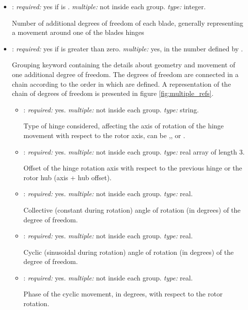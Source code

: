 \begin{itemize}
    \item {}: \textit{required:} yes if  is . \textit{multiple:} not inside each  group. \textit{type:} integer.
    
    Number of additional degrees of freedom of each blade, generally representing a movement around one of the blades hinges
    
    \item {}: \textit{required:} yes if  is greater than zero. \textit{multiple:} yes, in the number defined by . 
    
    Grouping keyword containing the details about geometry and movement of one additional degree of freedom. The degrees of freedom are connected in a chain according to the order in which are defined. A representation of the chain of degrees of freedom is presented in figure \ref{fig:multiple_refs}.
    
    \begin{itemize}
    \item {}: \textit{required:} yes. \textit{multiple:} not inside each  group. \textit{type:} string.
    
    Type of hinge considered, affecting the axis of rotation of the hinge movement with respect to the rotor axis, can be ,, or .
    
    \item {}: \textit{required:} yes. \textit{multiple:} not inside each  group. \textit{type:} real array of length 3.
    
    Offset of the hinge rotation axis with respect to the previous hinge or the rotor hub (axis + hub offset).
    
    \item {}: \textit{required:} yes. \textit{multiple:} not inside each  group. \textit{type:} real.
    
    Collective (constant during rotation) angle of rotation (in degrees) of the degree of freedom.
    
    \item {}: \textit{required:} yes. \textit{multiple:} not inside each  group. \textit{type:} real.
    
    Cyclic (sinusoidal during rotation) angle of rotation (in degrees) of the degree of freedom.
    
        \item {}: \textit{required:} yes. \textit{multiple:} not inside each  group. \textit{type:} real.
    
    Phase of the cyclic movement, in degrees, with respect to the rotor rotation. 
    
    \end{itemize}
\end{itemize}

